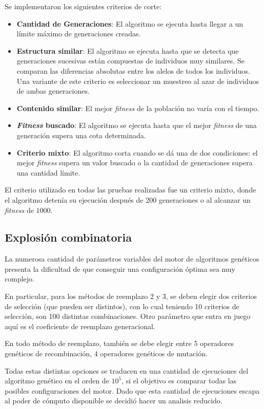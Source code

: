 \documentclass[letterpaper,twocolumn,10pt]{article}
\begin{document}
Se implementaron los siguientes criterios de corte:

\begin{itemize}
    \item \textbf{Cantidad de Generaciones}: El algoritmo se ejecuta hasta llegar a un
    límite máximo de generaciones creadas.
    \item \textbf{Estructura similar}: El algoritmo se ejecuta hasta que se detecta que
    generaciones sucesivas están compuestas de individuos muy similares. Se comparan las
    diferencias absolutas entre los alelos de todos los individuos. Una variante de este
    criterio es seleccionar un muestreo al azar de individuos de ambas generaciones.
    \item \textbf{Contenido similar}: El mejor \textit{fitness} de la población no varía
    con el tiempo.
    \item \textbf{\textit{Fitness} buscado}: El algoritmo se ejecuta hasta que el mejor
    \textit{fitness} de una generación supera una cota determinada.
    \item \textbf{Criterio mixto}: El algoritmo corta cuando se dá una de dos condiciones:
        el mejor \textit{fitness} supera un valor buscado o la cantidad de
        generaciones supera una cantidad límite.
\end{itemize}

El criterio utilizado en todas las pruebas realizadas fue un criterio mixto, donde el 
algoritmo detenía su ejecución después de $200$ generaciones o al alcanzar un
\textit{fitness} de $1000$.

\subsection{Explosión combinatoria}

La numerosa cantidad de parámetros variables del motor de algoritmos genéticos
presenta la dificultad de que conseguir una configuración óptima sea muy complejo.

En particular, para los métodos de reemplazo 2 y 3, se deben elegir dos criterios de
selección (que pueden ser distintos), con lo cual teniendo 10 criterios de selección, son
100 distintas combinaciones. Otro parámetro que entra en juego aquí es el coeficiente
de reemplazo generacional.

En todo método de reemplazo, también se debe elegir entre 5 operadores genéticos de
recombinación, 4 operadores genéticos de mutación.

Todas estas distintas opciones se traducen en una cantidad de ejecuciones del
algoritmo genético en el orden de $10^5$, si el objetivo es comparar todas las
posibles configuraciones del motor. Dado que esta cantidad de ejecuciones escapa al poder
de cómputo disponible se decidió hacer un analisis reducido.
\end{document}
